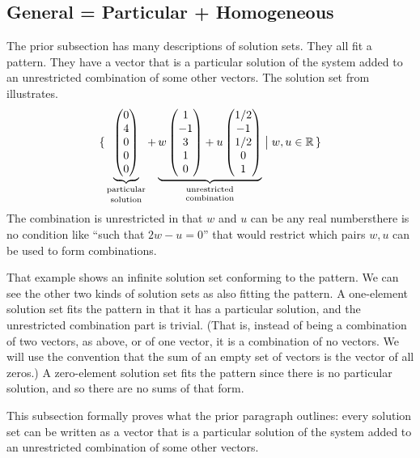 \subsection{General = Particular + Homogeneous}
The prior subsection has many descriptions of solution sets.
They all fit a pattern.
They have a vector that is a particular solution 
of the system added to an unrestricted combination of some other vectors.
The solution set from 
 illustrates.
\begin{equation*}
  \set{
   \underbrace{
     \colvec{0 \\ 4 \\ 0 \\ 0 \\ 0}}_{\text{\shortstack{particular \\
                                                    solution}}}+
   \underbrace{w\colvec{1 \\ -1 \\ 3 \\ 1 \\ 0}+
       u\colvec{1/2 \\ -1 \\ 1/2 \\ 0 \\ 1}}_{\text{\shortstack{unrestricted\\
                                                                combination}}}
       \suchthat w,u\in\Re}
\end{equation*}
The combination is unrestricted in that 
$w$ and $u$ can be any real numbers\Dash there
is no condition like ``such that $2w-u=0$'' that
would restrict which pairs $w,u$ can be used to form combinations.

That example shows an infinite solution set conforming to the pattern.
We can see the other two kinds of solution sets as also fitting
the pattern.
A one-element solution set fits the pattern in that it 
has a particular solution, 
and the unrestricted combination part is trivial. 
(That is, instead of being a combination of two vectors, as above, or
of one vector, it is a combination of no vectors.
We will use the convention that the sum of an empty set of vectors
is the vector of all zeros.)
A zero-element solution set fits the pattern since there is no 
particular solution, and so there are no sums of that form.

This subsection formally proves what the prior paragraph outlines: 
every solution set can be written as 
a vector that is a particular solution 
of the system added to an unrestricted combination of some other vectors.

